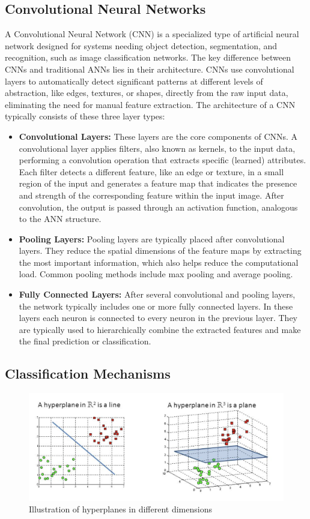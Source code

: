 \documentclass[12pt,fleqn,a4paper]{article}
\begin{document}
\subsection{Convolutional Neural Networks}
A Convolutional Neural Network (CNN) is a specialized type of artificial neural network designed for systems needing object detection, segmentation, and recognition, such as image classification networks. The key difference between CNNs and traditional ANNs lies in their architecture. CNNs use convolutional layers to automatically detect significant patterns at different levels of abstraction, like edges, textures, or shapes, directly from the raw input data, eliminating the need for manual feature extraction.
The architecture of a CNN typically consists of these three layer types:
\begin{itemize}
\item\textbf{Convolutional Layers:} These layers are the core components of CNNs. A convolutional layer applies filters, also known as kernels, to the input data, performing a convolution operation that extracts specific (learned) attributes. Each filter detects a different feature, like an edge or texture, in a small region of the input and generates a feature map that indicates the presence and strength of the corresponding feature within the input image. After convolution, the output is passed through an activation function, analogous to the ANN structure.

\item\textbf{Pooling Layers:} Pooling layers are typically placed after convolutional layers. They reduce the spatial dimensions of the feature maps by extracting the most important information, which also helps reduce the computational load. Common pooling methods include max pooling and average pooling.

\item\textbf{Fully Connected Layers:} After several convolutional and pooling layers, the network typically includes one or more fully connected layers. In these layers each neuron is connected to every neuron in the previous layer. They are typically used to hierarchically combine the extracted features and make the final prediction or classification.
\end{itemize}

\subsection{Classification Mechanisms}
\begin{figure}[H]
    \centering
    \includegraphics[width=0.7\linewidth]{graphs/hyperplane.png}
    \caption{Illustration of hyperplanes in different dimensions \cite{Hyperplane}}
    \label{fig:hyperplane}
\end{figure}
\end{document}
